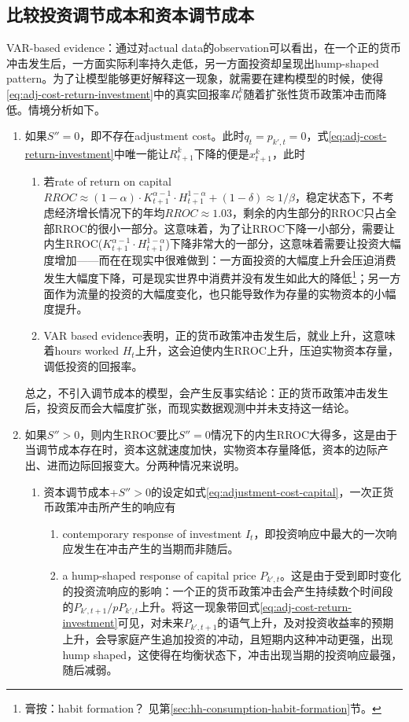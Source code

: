 \begin{subappendices}
\subsection{比较投资调节成本和资本调节成本}
\label{sec:adj-cost-comp-inv}
VAR-based evidence：通过对actual data的observation可以看出，在一个正的货币冲击发生后，一方面实际利率持久走低，另一方面投资却呈现出hump-shaped pattern。为了让模型能够更好解释这一现象，就需要在建构模型的时候，使得\eqref{eq:adj-cost-return-investment}中的真实回报率$R^k_{t}$随着扩张性货币政策冲击而降低。情境分析如下。
\begin{enumerate}
\item 如果$S''=0$，即不存在adjustment cost。此时$q_t = p_{k',t}=0$，式\eqref{eq:adj-cost-return-investment}中唯一能让$R^k_{t+1}$下降的便是$x^k_{t+1}$，此时
\begin{enumerate}
\item 若rate of return on capital $RROC \approx (1-\alpha) \cdot K_{t+1}^{\alpha-1} \cdot H_{t+1}^{1-\alpha} + (1-\delta) \approx 1/\beta$，稳定状态下，不考虑经济增长情况下的年均$RROC \approx 1.03$，剩余的内生部分的RROC只占全部RROC的很小一部分。这意味着，为了让RROC下降一小部分，需要让内生RROC($K_{t+1}^{\alpha-1} \cdot H_{t+1}^{1-\alpha}$)下降非常大的一部分，这意味着需要让投资大幅度增加——而在在现实中很难做到：一方面投资的大幅度上升会压迫消费发生大幅度下降，可是现实世界中消费并没有发生如此大的降低\footnote{膏按：habit formation？ 见第\ref{sec:hh-consumption-habit-formation}节。}；另一方面作为流量的投资的大幅度变化，也只能导致作为存量的实物资本的小幅度提升。
\item VAR based evidence表明，正的货币政策冲击发生后，就业上升，这意味着hours worked $H_t$上升，这会迫使内生RROC上升，压迫实物资本存量，调低投资的回报率。
\end{enumerate}

总之，不引入调节成本的模型，会产生反事实结论：正的货币政策冲击发生后，投资反而会大幅度扩张，而现实数据观测中并未支持这一结论。
\item 如果$S'' >0$，则内生RROC要比$S''=0$情况下的内生RROC大得多，这是由于当调节成本存在时，资本这就速度加快，实物资本存量降低，资本的边际产出、进而边际回报变大。分两种情况来说明。
\begin{enumerate}
\item 资本调节成本+$S'' >0$的设定如式\eqref{eq:adjustment-cost-capital}，一次正货币政策冲击所产生的响应有
\begin{enumerate}
\item contemporary response of investment $I_t$，即投资响应中最大的一次响应发生在冲击产生的当期而非随后。
\item a hump-shaped response of capital price $P_{k',t}$。这是由于受到即时变化的投资流响应的影响：一个正的货币政策冲击会产生持续数个时间段的$P_{k',t+1}/pP_{k',t}$上升。将这一现象带回式\eqref{eq:adj-cost-return-investment}可见，对未来$P_{k',t+1}$的语气上升，及对投资收益率的预期上升，会导家庭产生追加投资的冲动，且短期内这种冲动更强，出现hump shaped，这使得在均衡状态下，冲击出现当期的投资响应最强，随后减弱。
\end{enumerate}


\end{enumerate}
\end{enumerate}
\end{subappendices}
